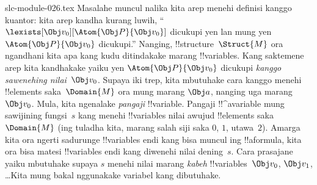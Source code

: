 \begin{filecontents*}[overwrite]{slc-module-026.tex}
Masalahe muncul nalika kita arep menehi definisi kanggo kuantor: kita
arep kandha kurang luwih, ``$\lexists[\Obj v_0][\Atom{\Obj P}{\Obj
v_0}]$ dicukupi yen lan mung yen $\Atom{\Obj P}{\Obj v_0}$ dicukupi.''
Nanging, !!{structure}~$\Struct{M}$ ora ngandhani kita apa kang kudu
ditindakake marang !!{variable}s. Kang saktemene arep kita kandhakake
yaiku yen $\Atom{\Obj P}{\Obj v_0}$ dicukupi \emph{kanggo sawenehing
nilai~$\Obj v_0$}. Supaya iki trep, kita mbutuhake cara kanggo menehi
!!{element}s saka~$\Domain{M}$ ora mung marang $\Obj a$, nanging uga
marang~$\Obj v_0$. Mula, kita ngenalake \emph{pangaji} !!{variable}.
Pangaji !!^a{variable} mung sawijining fungsi~$s$ kang menehi
!!{variable}s nilai awujud !!{element}s saka~$\Domain{M}$ (ing tuladha kita,
marang salah siji saka $0$, $1$, utawa~$2$). Amarga
kita ora ngerti sadurunge !!{variable}s endi kang bisa muncul ing
!!a{formula}, kita ora bisa matesi !!{variable}s endi kang diwenehi
nilai dening~$s$. Cara prasajane yaiku mbutuhake supaya $s$ menehi nilai
marang \emph{kabeh} !!{variable}s~$\Obj v_0$, $\Obj v_1$, \dots\@ Kita
mung bakal nggunakake variabel kang dibutuhake.


\end{filecontents*}
